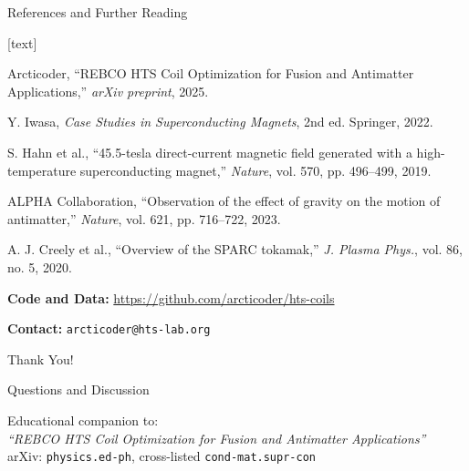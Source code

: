 \documentclass[aspectratio=169,xcolor={table,dvipsnames}]{beamer}
\begin{document}
\begin{frame}{References and Further Reading}
    \begin{thebibliography}{10}
        [text]
        
         Arcticoder, ``REBCO HTS Coil Optimization for Fusion and Antimatter Applications,'' \textit{arXiv preprint}, 2025.
        
         Y. Iwasa, \textit{Case Studies in Superconducting Magnets}, 2nd ed. Springer, 2022.
        
         S. Hahn et al., ``45.5-tesla direct-current magnetic field generated with a high-temperature superconducting magnet,'' \textit{Nature}, vol. 570, pp. 496--499, 2019.
        
         ALPHA Collaboration, ``Observation of the effect of gravity on the motion of antimatter,'' \textit{Nature}, vol. 621, pp. 716--722, 2023.
        
         A. J. Creely et al., ``Overview of the SPARC tokamak,'' \textit{J. Plasma Phys.}, vol. 86, no. 5, 2020.
        
    \end{thebibliography}
    
    \vspace{0.5cm}
    \textbf{Code and Data:} \url{https://github.com/arcticoder/hts-coils}
    
    \textbf{Contact:} \texttt{arcticoder@hts-lab.org}
\end{frame}

\begin{frame}
    \begin{center}
        \Huge Thank You!
        
        \vspace{1cm}
        \Large Questions and Discussion
        
        \vspace{1cm}
        \normalsize
        Educational companion to:\\
        \textit{``REBCO HTS Coil Optimization for Fusion and Antimatter Applications''}\\
        \vspace{0.3cm}
        arXiv: \texttt{physics.ed-ph}, cross-listed \texttt{cond-mat.supr-con}
    \end{center}
\end{frame}
\end{document}
